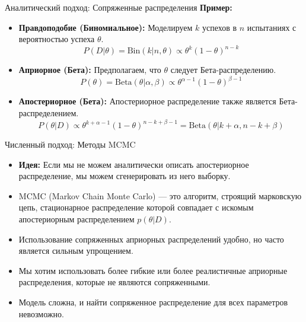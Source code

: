 \documentclass[notheorems, handout]{beamer}
\begin{document}
\begin{frame}{Аналитический подход: Сопряженные распределения}
 \textbf{Пример:}
    \begin{itemize}
        \item \textbf{Правдоподобие (Биномиальное):} Моделируем $k$ успехов в $n$ испытаниях с вероятностью успеха $\theta$.
        \begin{equation*}
            P(D|\theta) = \text{Bin}(k|n, \theta) \propto \theta^k (1-\theta)^{n-k}
        \end{equation*}
        \item \textbf{Априорное (Бета):} Предполагаем, что $\theta$ следует Бета-распределению.
        \begin{equation*}
            P(\theta) = \text{Beta}(\theta|\alpha, \beta) \propto \theta^{\alpha-1} (1-\theta)^{\beta-1}
        \end{equation*}
        \item \textbf{Апостериорное (Бета):} Апостериорное распределение также является Бета-распределением.
        \begin{equation*}
            P(\theta|D) \propto \theta^{k+\alpha-1} (1-\theta)^{n-k+\beta-1} = \text{Beta}(\theta|k+\alpha, n-k+\beta)
        \end{equation*}
    \end{itemize}
\end{frame}
\begin{frame}{Численный подход: Методы MCMC}
    \begin{itemize}
        \item \textbf{Идея:} Если мы не можем аналитически описать апостериорное распределение, мы можем сгенерировать из него выборку.
        \item MCMC (Markov Chain Monte Carlo) --- это алгоритм, строящий марковскую цепь, стационарное распределение которой совпадает с искомым апостериорным распределением $p(\theta|D)$.
         \item Использование сопряженных априорных распределений удобно, но часто является сильным упрощением.
        \item Мы хотим использовать более гибкие или более реалистичные априорные распределения, которые не являются сопряженными.
        \item Модель сложна, и найти сопряженное распределение для всех параметров невозможно.
    \end{itemize}
    \vspace{0.5cm}
\end{frame}
\end{document}
